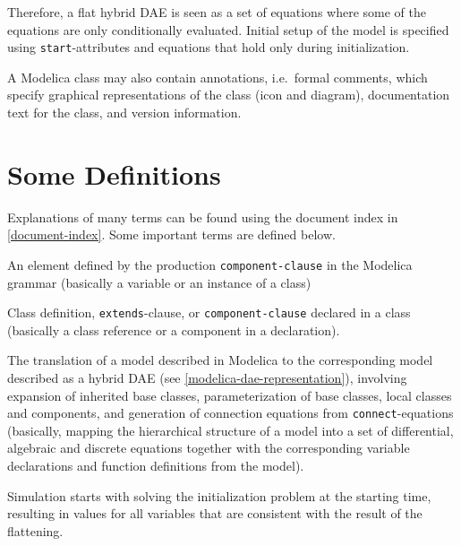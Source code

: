 Therefore, a flat hybrid DAE is seen as a set of equations where some of the equations are only conditionally evaluated.
Initial setup of the model is specified using \lstinline!start!-attributes and equations that hold only during initialization.

A Modelica class may also contain annotations, i.e.\ formal comments, which specify graphical representations of the class (icon and diagram), documentation text for the class, and version information.

\section{Some Definitions}\label{some-definitions}

Explanations of many terms can be found using the document index in \cref{document-index}.
Some important terms are defined below.

\begin{definition}[Component]
An element defined by the production \lstinline[language=grammar]!component-clause! in the Modelica grammar (basically a variable or an instance of a class)
\end{definition}

\begin{definition}[Element]
Class definition, \lstinline!extends!-clause, or \lstinline[language=grammar]!component-clause! declared in a class (basically a class reference or a component in a declaration).
\end{definition}

\begin{definition}[Flattening]
The translation of a model described in Modelica to the corresponding model described as a hybrid DAE (see \cref{modelica-dae-representation}), involving expansion of inherited base classes, parameterization of base classes, local classes
and components, and generation of connection equations from \lstinline!connect!-equations (basically, mapping the hierarchical structure of a model into a set of differential, algebraic and discrete equations together with the corresponding variable declarations and function definitions from the model).
\end{definition}

\begin{definition}[Initialization]
Simulation starts with solving the initialization problem at the starting time, resulting in values for all variables that are consistent with the result of the flattening.
\end{definition}

